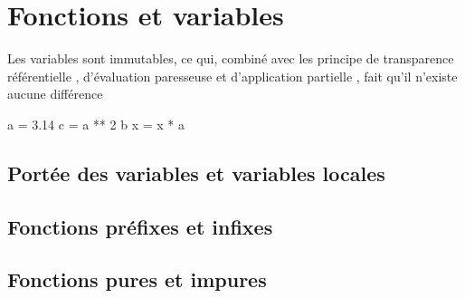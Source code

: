 \section{Fonctions et variables}
\label{sec:functions-and-variables}

Les variables sont immutables, ce qui, combiné avec les principe de transparence référentielle , d'évaluation paresseuse  et d'application partielle , fait qu'il n'existe aucune différence 

\begin{haskellcode}
a = 3.14
c = a ** 2
b x = x * a
\end{haskellcode}

\subsection{Portée des variables et variables locales}

\subsection{Fonctions préfixes et infixes}

\subsection{Fonctions pures et impures}
